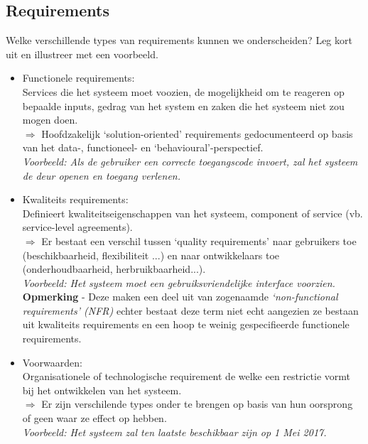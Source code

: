 \documentclass{article}
\begin{document}
\subsection{Requirements}

\begin{quest}{}Welke verschillende types van requirements kunnen we onderscheiden? Leg kort uit en illustreer met een voorbeeld.
\end{quest}

\begin{itemize}
    \item Functionele requirements: \\
    Services die het systeem moet voozien, de mogelijkheid om te reageren op bepaalde inputs, gedrag van het system en zaken die het systeem niet zou mogen doen.\\
    $\Rightarrow$ Hoofdzakelijk `solution-oriented' requirements gedocumenteerd op basis van het data-, functioneel- en `behavioural'-perspectief.\\
    \textit{Voorbeeld: Als de gebruiker een correcte toegangscode invoert, zal het systeem de deur openen en toegang verlenen.}
    \item Kwaliteits requirements: \\
    Definieert kwaliteitseigenschappen van het systeem, component of service (vb. service-level agreements).\\
    $\Rightarrow$ Er bestaat een verschil tussen `quality requirements' naar gebruikers toe (beschikbaarheid, flexibiliteit ...) en naar ontwikkelaars toe (onderhoudbaarheid, herbruikbaarheid...).\\
      \textit{Voorbeeld: Het systeem moet een gebruiksvriendelijke interface voorzien.}\\
      \textbf{Opmerking} - Deze maken een deel uit van zogenaamde \textit{`non-functional requirements' (NFR)} echter bestaat deze term niet echt aangezien ze bestaan uit kwaliteits requirements en een hoop te weinig gespecifieerde functionele requirements.
    \item Voorwaarden: \\ 
    Organisationele of technologische requirement de welke een restrictie vormt bij het ontwikkelen van het systeem.\\
    $\Rightarrow$ Er zijn verschilende types onder te brengen op basis van hun oorsprong of geen waar ze effect op hebben.\\
    \textit{Voorbeeld: Het systeem zal ten laatste beschikbaar zijn op 1 Mei 2017.}
\end{itemize}
\end{document}
